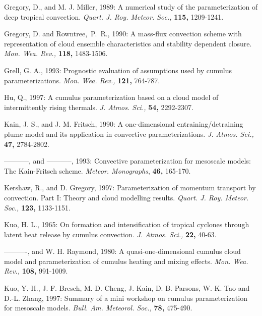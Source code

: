 
\por
Gregory, D., and M. J. Miller, 1989: A numerical study of the parameterization
of deep tropical convection. {\it Quart. J. Roy. Meteor. Soc.,}
{\bf 115,} 1209-1241.

\por
Gregory, D.  and  Rowntree,~P.~R.,
1990:
A mass-flux convection scheme with
representation of cloud ensemble characteristics and stability
dependent closure. {\it Mon. Wea. Rev.,} {\bf 118,} 1483-1506.

\por
Grell, G. A., 1993: Prognostic evaluation of assumptions used by
cumulus parameterizations. {\it Mon. Wea. Rev.,} {\bf 121,} 764-787.

\por
Hu, Q., 1997: A cumulus parameterization based on a cloud model of
intermittently rising thermals. {\it J. Atmos. Sci.,} {\bf 54,} 2292-2307.

\por
Kain, J. S., and J. M. Fritsch, 1990: A one-dimensional
entraining/detraining plume model and its application in
convective parameterizations. {\it J. Atmos. Sci.,}
{\bf 47,} 2784-2802.

\por
-----------, and -----------, 1993: Convective parameterization for mesoscale
models: The Kain-Fritsch scheme.
{\it Meteor. Monographs}, {\bf 46,} 165-170.

\por
Kershaw, R., and D. Gregory, 1997: Parameterization of momentum
transport by convection. Part I: Theory and cloud modelling results.
{\it Quart. J. Roy. Meteor. Soc.,} {\bf 123,} 1133-1151.


\por
Kuo, H. L., 1965: On formation and intensification of tropical cyclones
through latent heat release by cumulus convection.
{\it J. Atmos. Sci.,} {\bf 22,} 40-63.

\por
----------, and W. H. Raymond, 1980: A quasi-one-dimensional
cumulus cloud model and parameterization of cumulus heating
and mixing effects. {\it Mon. Wea. Rev.,} {\bf 108,} 991-1009.

\por
Kuo, Y.-H., J. F. Bresch, M.-D. Cheng, J. Kain, D. B. Parsons,
W.-K. Tao and D.-L. Zhang, 1997: Summary of a mini workshop on cumulus
parameterization for mesoscale models.
{\it Bull. Am. Meteorol. Soc.,} {\bf 78,} 475-490.

